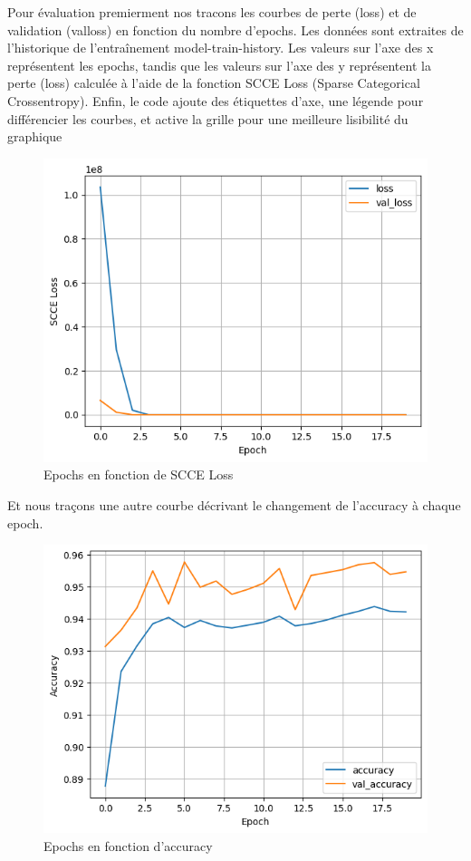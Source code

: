 \documentclass[a4paper,12pt]{report}
\begin{document}
\noindent \normalsize Pour évaluation premierment nos tracons les courbes de perte (loss) et de validation (valloss) en fonction du nombre d'epochs. Les données sont extraites de l'historique de l'entraînement model-train-history. Les valeurs sur l'axe des x représentent les epochs, tandis que les valeurs sur l'axe des y représentent la perte (loss) calculée à l'aide de la fonction SCCE Loss (Sparse Categorical Crossentropy). Enfin, le code ajoute des étiquettes d'axe, une légende pour différencier les courbes, et active la grille pour une meilleure lisibilité du graphique
\begin{figure}[H]
\centering
 \includegraphics[scale=0.7]{outils-images/graphs/g8.png}
\caption{Epochs en fonction de SCCE Loss}
\end{figure}
Et nous traçons une autre courbe décrivant le changement de l'accuracy à chaque epoch.
\begin{figure}[H]
\centering
 \includegraphics[scale=0.7]{outils-images/graphs/g9.png}
\caption{Epochs en fonction d'accuracy}
\end{figure}
\end{document}
